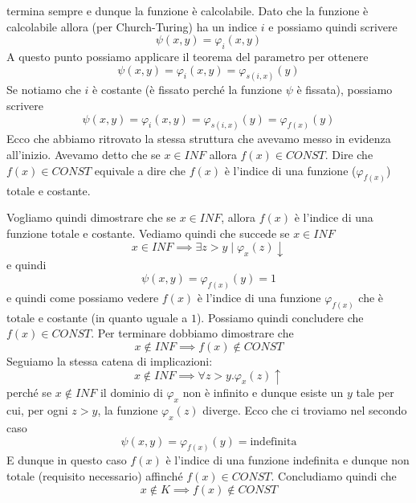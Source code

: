 termina sempre e dunque la funzione è calcolabile. Dato che la
funzione è calcolabile allora (per Church-Turing) ha un indice
$i$ e possiamo quindi scrivere
\[ \psi(x, y) = \varphi_i (x, y) \]
A questo punto possiamo applicare il teorema del parametro per
ottenere
\[ \psi(x, y) = \varphi_i (x, y) = \varphi_{s(i,x)} (y) \]
Se notiamo che $i$ è costante (è fissato perché la funzione
$\psi$ è fissata), possiamo scrivere
\[
	\psi(x, y) = \varphi_i (x, y) =
	\varphi_{s(i,x)} (y) = \varphi_{f(x)} (y)
\]
Ecco che abbiamo ritrovato la stessa struttura che avevamo messo
in evidenza all'inizio. Avevamo detto che se $x \in INF$ allora
$f(x) \in CONST$. Dire che $f(x) \in CONST$ equivale a dire che
$f(x)$ è l'indice di una funzione ($\varphi_{f(x)}$) totale e
costante.

Vogliamo quindi dimostrare che se $x \in INF$, allora $f(x)$ è
l'indice di una funzione totale e costante. Vediamo quindi che
succede se $x \in INF$
\[ x \in INF \implies \exists z > y \mid \varphi_x (z) \downarrow \]
e quindi
\[ \psi (x, y) = \varphi_{f(x)} (y) = 1 \]
e quindi come possiamo vedere $f(x)$ è l'indice di una funzione
$\varphi_{f(x)}$ che è totale e costante (in quanto uguale a $1$).
Possiamo quindi concludere che $f(x) \in CONST$. Per terminare
dobbiamo dimostrare che
\[ x \notin INF \implies f(x) \notin CONST \]
Seguiamo la stessa catena di implicazioni:
\[ x \notin INF \implies \forall z > y . \varphi_x (z) \uparrow \]
perché se $x \notin INF$ il dominio di $\varphi_x$ non è infinito
e dunque esiste un $y$ tale per cui, per ogni $z > y$, la funzione
$\varphi_x(z)$ diverge. Ecco che ci troviamo nel secondo caso
\[ \psi (x, y) = \varphi_{f(x)} (y) = \text{indefinita} \]
E dunque in questo caso $f(x)$ è l'indice di una funzione
indefinita e dunque non totale (requisito necessario) affinché
$f(x) \in CONST$. Concludiamo quindi che
\[ x \notin K \implies f(x) \notin CONST \]